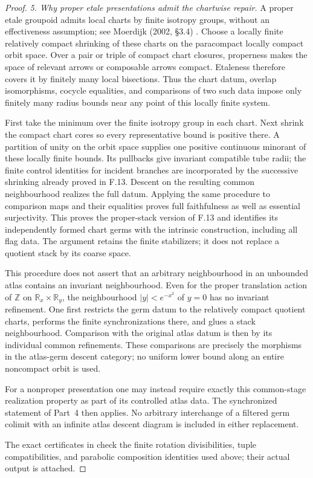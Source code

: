 \begin{proof}
\emph{5. Why proper etale presentations admit the chartwise repair.}
A proper etale groupoid admits local charts by finite isotropy
groups, without an effectiveness assumption; see Moerdijk (2002,
\S3.4) \citep{FA_Moerdijk2002}. Choose a locally finite relatively
compact shrinking of these charts on the paracompact locally
compact orbit space. Over a pair or triple of compact chart
closures, properness makes the space of relevant arrows or
composable arrows compact. Etaleness therefore covers it by
finitely many local bisections. Thus the chart datum, overlap
isomorphisms, cocycle equalities, and comparisons of two such data
impose only finitely many radius bounds near any point of this
locally finite system.

First take the minimum over the finite isotropy group in each
chart. Next shrink the compact chart cores so every representative
bound is positive there. A partition of unity on the orbit space
supplies one positive continuous minorant of these locally finite
bounds. Its pullbacks give invariant compatible tube radii; the
finite control identities for incident branches are incorporated
by the successive shrinking already proved in F.13. Descent on
the resulting common neighbourhood realizes the full datum.
Applying the same procedure to comparison maps and their
equalities proves full faithfulness as well as essential
surjectivity. This proves the proper-stack version of F.13 and
identifies its independently formed chart germs with the intrinsic
construction, including all flag data. The argument retains the
finite stabilizers; it does not replace a quotient stack by its
coarse space.

This procedure does not assert that an arbitrary neighbourhood in
an unbounded atlas contains an invariant neighbourhood. Even for
the proper translation action of $\mathbb Z$ on
$\mathbb R_x\times\mathbb R_y$, the neighbourhood
$|y|<e^{-x^2}$ of $y=0$ has no invariant refinement. One first
restricts the germ datum to the relatively compact quotient charts,
performs the finite synchronizations there, and glues a stack
neighbourhood. Comparison with the original atlas datum is then by
its individual common refinements. These comparisons are precisely
the morphisms in the atlas-germ descent category; no uniform lower
bound along an entire noncompact orbit is used.

For a nonproper presentation one may instead require exactly this
common-stage realization property as part of its controlled atlas
data. The synchronized statement of Part~4 then applies. No
arbitrary interchange of a filtered germ colimit with an infinite
atlas descent diagram is included in either replacement.

The exact certificates in  check the finite
rotation divisibilities, tuple compatibilities, and parabolic composition
identities used above; their actual output is attached.
\end{proof}
